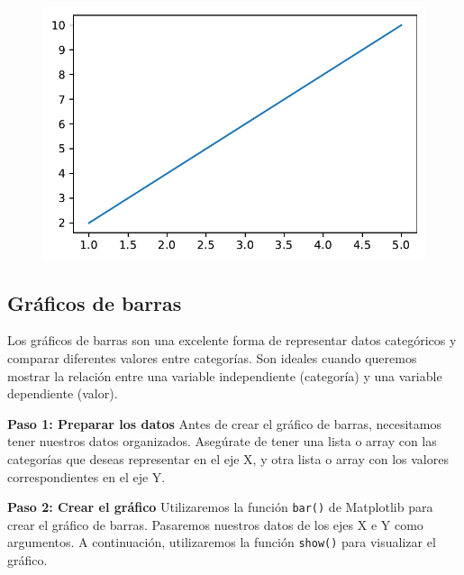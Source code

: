 \documentclass[
  a4paper,
]{article}
\begin{document}
\begin{figure}[H]

{\centering \includegraphics{index_files/figure-pdf/cell-2-output-1.pdf}

}

\end{figure}

\hypertarget{gruxe1ficos-de-barras}{%
\subsection{Gráficos de barras}\label{gruxe1ficos-de-barras}}

Los gráficos de barras son una excelente forma de representar datos
categóricos y comparar diferentes valores entre categorías. Son ideales
cuando queremos mostrar la relación entre una variable independiente
(categoría) y una variable dependiente (valor).

\textbf{Paso 1: Preparar los datos} Antes de crear el gráfico de barras,
necesitamos tener nuestros datos organizados. Asegúrate de tener una
lista o array con las categorías que deseas representar en el eje X, y
otra lista o array con los valores correspondientes en el eje Y.

\textbf{Paso 2: Crear el gráfico} Utilizaremos la función \texttt{bar()}
de Matplotlib para crear el gráfico de barras. Pasaremos nuestros datos
de los ejes X e Y como argumentos. A continuación, utilizaremos la
función \texttt{show()} para visualizar el gráfico.
\end{document}
